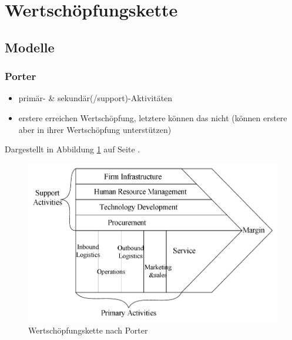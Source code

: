 \clearpage
\section{Wertschöpfungskette}
\subsection{Modelle}
\subsubsection{Porter}
\begin{itemize}
	\item primär- \& sekundär(/support)-Aktivitäten
	\item erstere erreichen Wertschöpfung, letztere können das nicht (können erstere aber in ihrer Wertschöpfung unterstützen)
\end{itemize}
Dargestellt in Abbildung \ref{fig:porter_00} auf Seite \pageref{fig:porter_00}.
\begin{figure}[htb]
\centering
\includegraphics[width=\textwidth]{img/value_chain_porter.png}
\caption{Wertschöpfungskette nach Porter}
\label{fig:porter_00}
\end{figure}
